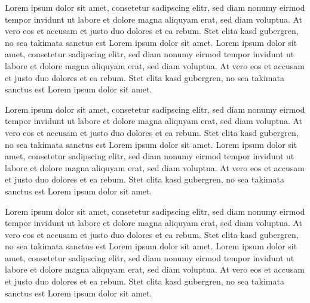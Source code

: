 Lorem ipsum dolor sit amet, consetetur sadipscing elitr, sed diam nonumy eirmod tempor invidunt ut labore et dolore magna aliquyam erat, sed diam voluptua. At vero eos et accusam et justo duo dolores et ea rebum. Stet clita kasd gubergren, no sea takimata sanctus est Lorem ipsum dolor sit amet. Lorem ipsum dolor sit amet, consetetur sadipscing elitr, sed diam nonumy eirmod tempor invidunt ut labore et dolore magna aliquyam erat, sed diam voluptua. At vero eos et accusam et justo duo dolores et ea rebum. Stet clita kasd gubergren, no sea takimata sanctus est Lorem ipsum dolor sit amet.

Lorem ipsum dolor sit amet, consetetur sadipscing elitr, sed diam nonumy eirmod tempor invidunt ut labore et dolore magna aliquyam erat, sed diam voluptua. At vero eos et accusam et justo duo dolores et ea rebum. Stet clita kasd gubergren, no sea takimata sanctus est Lorem ipsum dolor sit amet. Lorem ipsum dolor sit amet, consetetur sadipscing elitr, sed diam nonumy eirmod tempor invidunt ut labore et dolore magna aliquyam erat, sed diam voluptua. At vero eos et accusam et justo duo dolores et ea rebum. Stet clita kasd gubergren, no sea takimata sanctus est Lorem ipsum dolor sit amet.

Lorem ipsum dolor sit amet, consetetur sadipscing elitr, sed diam nonumy eirmod tempor invidunt ut labore et dolore magna aliquyam erat, sed diam voluptua. At vero eos et accusam et justo duo dolores et ea rebum. Stet clita kasd gubergren, no sea takimata sanctus est Lorem ipsum dolor sit amet. Lorem ipsum dolor sit amet, consetetur sadipscing elitr, sed diam nonumy eirmod tempor invidunt ut labore et dolore magna aliquyam erat, sed diam voluptua. At vero eos et accusam et justo duo dolores et ea rebum. Stet clita kasd gubergren, no sea takimata sanctus est Lorem ipsum dolor sit amet.